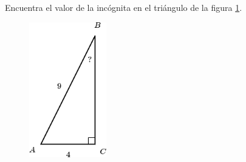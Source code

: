 Encuentra el valor de la incógnita en el triángulo de la figura \ref{fig:angle_functrig_10}.
\begin{figure}[H]
    \begin{center}
        \includegraphics[width=0.3\textwidth]{../images/angle_functrig_10.png}
    \end{center}
    \caption{}
    \label{fig:angle_functrig_10}
\end{figure}